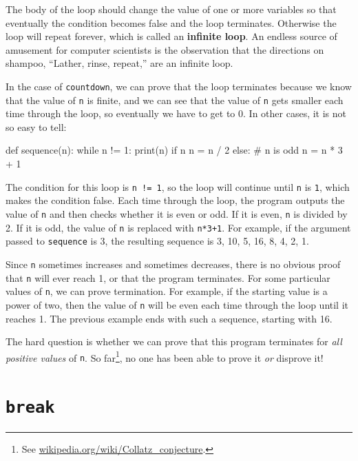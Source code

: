 
The body of the loop should change the value of one or more variables
so that eventually the condition becomes false and the loop
terminates.  Otherwise the loop will repeat forever, which is called
an {\bf infinite loop}.  An endless source of amusement for computer
scientists is the observation that the directions on shampoo,
``Lather, rinse, repeat,'' are an infinite loop.


In the case of {\tt countdown}, we can prove that the loop
terminates because we know that the value of {\tt n} is finite, and we
can see that the value of {\tt n} gets smaller each time through the
loop, so eventually we have to get to 0.  In other
cases, it is not so easy to tell:

\beforeverb
\begin{pycode}
def sequence(n):
    while n != 1:
        print(n)
        if n %
            n = n / 2
        else:               # n is odd
            n = n * 3 + 1
\end{pycode}
\afterverb
%
The condition for this loop is {\tt n != 1}, so the loop will continue
until {\tt n} is {\tt 1}, which makes the condition false.
%
Each time through the loop, the program outputs the value of {\tt n}
and then checks whether it is even or odd.  If it is even, {\tt n} is 
divided by 2.  If it is odd, the value of {\tt n} is replaced with
{\tt n*3+1}. For example, if the argument passed
to {\tt sequence} is 3, the resulting sequence is 3, 10, 5, 16, 8, 4, 2, 1.

Since {\tt n} sometimes increases and sometimes decreases, there is no
obvious proof that {\tt n} will ever reach 1, or that the program
terminates.  For some particular values of {\tt n}, we can prove
termination.  For example, if the starting value is a power of two,
then the value of {\tt n} will be even each time through the loop
until it reaches 1. The previous example ends with such a sequence,
starting with 16.


The hard question is whether we can prove that this program terminates
for {\em all positive values} of {\tt n}.  So far\footnote{See
  \url{wikipedia.org/wiki/Collatz_conjecture}.}, no one has
been able to prove it {\em or} disprove it!


\section{{\tt break}}

